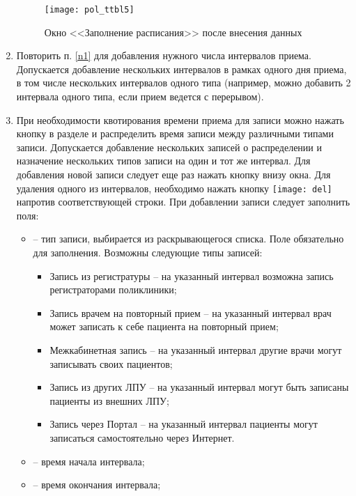 \begin{enumerate}
\begin{figure}[ht]\centering
 \texttt{[image: pol\_ttbl5]}
 \caption{Окно <<Заполнение расписания>> после внесения данных}
 \label{img_pol_ttbl5}
\end{figure}

 \item Повторить п. \ref{n1} для добавления нужного числа интервалов приема. Допускается добавление нескольких интервалов в рамках одного дня приема, в том числе нескольких интервалов одного типа (например, можно добавить 2 интервала одного типа, если прием ведется с перерывом). 
 
 \item При необходимости квотирования времени приема для записи можно нажать кнопку  в разделе  и распределить время записи между различными типами записи. Допускается добавление нескольких записей о распределении и назначение нескольких типов записи на один и тот же интервал. Для добавления новой записи следует еще раз нажать кнопку  внизу окна. Для удаления одного из интервалов, необходимо нажать кнопку \texttt{[image: del]} напротив соответствующей строки. При добавлении записи следует заполнить поля:
 \begin{itemize}
 	\item {} -- тип записи, выбирается из раскрывающегося списка. Поле обязательно для заполнения. Возможны следующие типы записей: 
 	\begin{itemize}
 		\item Запись из регистратуры -- на указанный интервал возможна запись регистраторами поликлиники;
 		\item Запись врачем на повторный прием -- на указанный интервал врач может записать к себе пациента на повторный прием;
 		\item Межкабинетная запись -- на указанный интервал другие врачи могут записывать своих пациентов;
 		\item Запись из других ЛПУ -- на указанный интервал могут быть записаны пациенты из внешних ЛПУ;
 		\item Запись через Портал -- на указанный интервал пациенты могут записаться самостоятельно через Интернет.		
 	\end{itemize}
 	\item {} -- время начала интервала;
 	\item {} -- время окончания интервала;	
 \end{itemize}


\end{enumerate}
